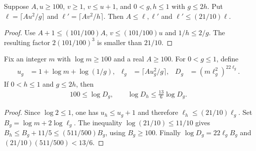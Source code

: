 \begin{lemma}
    \label{lem:ceil_quadratic_scale_half_step}
    \leanok
    Suppose $A,u\ge100$, $v\ge1$, $v\le u+1$, and
    $0<g,h\le1$ with $g\le2h$. Put
    $\ell=\lceil Au^2/g\rceil$ and $\ell'=\lceil Av^2/h\rceil$.
    Then $A\le\ell,\ell'$ and $\ell'\le(21/10)\ell$.
\end{lemma}
\begin{proof}
    \leanok
    Use $A+1\le(101/100)A$, $v\le(101/100)u$ and $1/h\le2/g$.
    The resulting factor $2(101/100)^3$ is smaller than $21/10$.
\end{proof}

\begin{theorem}
    \label{thm:log_polynomial_filter_count_half_step}
    \leanok
    Fix an integer $m$ with $\log m\ge100$ and a real $A\ge100$.
    For $0<g\le1$, define
    \begin{align*}
      u_g&=1+\log m+\log(1/g),&
      \ell_g&=\lceil Au_g^2/g\rceil,&
      D_g&=(m\ell_g^2)^{22\ell_g}.
    \end{align*}
    If $0<h\le1$ and $g\le2h$, then
    \begin{align*}
      100\le\log D_g,
      \qquad\log D_h\le\frac{13}{6}\log D_g.
    \end{align*}
\end{theorem}
\begin{proof}
    \leanok
    Since $\log2\le1$, one has $u_h\le u_g+1$ and therefore
    $\ell_h\le(21/10)\ell_g$. Set $B_g=\log m+2\log\ell_g$.
    The inequality $\log(21/10)\le11/10$ gives
    $B_h\le B_g+11/5\le(511/500)B_g$, using $B_g\ge100$.
    Finally $\log D_g=22\ell_gB_g$ and
    $(21/10)(511/500)<13/6$.
\end{proof}
